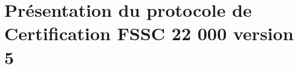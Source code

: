 


\setcounter{mtc}{4}
\chapter{ Présentation du protocole de Certification FSSC 22 000 version 5}
\minitoc %
\graphicspath{{Chapter1/figures/}}


\pagestyle{fancy}
\fancyhf{}
\fancyhead[R]{\bfseries\rightmark}
\fancyfoot[R]{\thepage}
\renewcommand{\headrulewidth}{0.5pt}
\renewcommand{\footrulewidth}{0pt}
\renewcommand{\chaptermark}[1]{\markboth{\MakeUppercase{\chaptername~\thechapter. #1 }}{}}
\renewcommand{\sectionmark}[1]{\markright{\thechapter.\thesection~ #1}}

